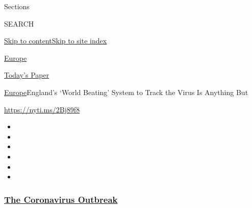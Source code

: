 Sections

SEARCH

\protect\hyperlink{site-content}{Skip to
content}\protect\hyperlink{site-index}{Skip to site index}

\href{https://www.nytimes3xbfgragh.onion/section/world/europe}{Europe}

\href{https://myaccount.nytimes3xbfgragh.onion/auth/login?response_type=cookie\&client_id=vi}{}

\href{https://www.nytimes3xbfgragh.onion/section/todayspaper}{Today's
Paper}

\href{/section/world/europe}{Europe}\textbar{}England's `World Beating'
System to Track the Virus Is Anything But

\url{https://nyti.ms/2Bj89f8}

\begin{itemize}
\item
\item
\item
\item
\item
\item
\end{itemize}

\hypertarget{the-coronavirus-outbreak}{%
\subsubsection{\texorpdfstring{\href{https://www.nytimes3xbfgragh.onion/news-event/coronavirus?name=styln-coronavirus-national\&region=TOP_BANNER\&variant=undefined\&block=storyline_menu_recirc\&action=click\&pgtype=Article\&impression_id=bf84ac00-e385-11ea-a4ee-ebb6d55f184c}{The
Coronavirus
Outbreak}}{The Coronavirus Outbreak}}\label{the-coronavirus-outbreak}}

